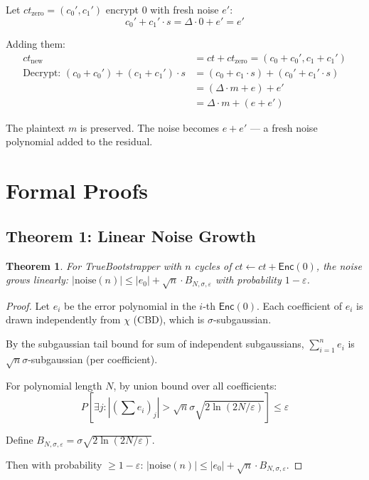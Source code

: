 \documentclass[11pt,a4paper]{article}
\newtheorem{theorem}{Theorem}[section]
\begin{document}
Let $ct_{\text{zero}} = (c_0', c_1')$ encrypt $0$ with fresh noise $e'$:
\[
c_0' + c_1' \cdot s = \Delta \cdot 0 + e' = e'
\]

Adding them:
\begin{align}
ct_{\text{new}} &= ct + ct_{\text{zero}} = (c_0 + c_0', c_1 + c_1') \\
\text{Decrypt: } (c_0 + c_0') + (c_1 + c_1') \cdot s &= (c_0 + c_1 \cdot s) + (c_0' + c_1' \cdot s) \nonumber \\
&= (\Delta \cdot m + e) + e' \nonumber \\
&= \Delta \cdot m + (e + e') \nonumber
\end{align}

The plaintext $m$ is preserved. The noise becomes $e + e'$ — a fresh noise polynomial added to the residual.

\section{Formal Proofs}

\subsection{Theorem 1: Linear Noise Growth}

\begin{theorem}
For TrueBootstrapper with $n$ cycles of $ct \leftarrow ct + \mathsf{Enc}(0)$, the noise grows linearly: $|\text{noise}(n)| \leq |e_0| + \sqrt{n} \cdot B_{N,\sigma,\varepsilon}$ with probability $1-\varepsilon$.
\end{theorem}

\begin{proof}
Let $e_i$ be the error polynomial in the $i$-th $\mathsf{Enc}(0)$. Each coefficient of $e_i$ is drawn independently from $\chi$ (CBD), which is $\sigma$-subgaussian.

By the subgaussian tail bound for sum of independent subgaussians, $\sum_{i=1}^n e_i$ is $\sqrt{n}\sigma$-subgaussian (per coefficient).

For polynomial length $N$, by union bound over all coefficients:
\[
P\left[\exists j: \left|\left(\sum e_i\right)_j\right| > \sqrt{n}\sigma\sqrt{2\ln(2N/\varepsilon)}\right] \leq \varepsilon
\]

Define $B_{N,\sigma,\varepsilon} = \sigma\sqrt{2\ln(2N/\varepsilon)}$.

Then with probability $\geq 1-\varepsilon$: $|\text{noise}(n)| \leq |e_0| + \sqrt{n} \cdot B_{N,\sigma,\varepsilon}$.
\end{proof}
\end{document}
